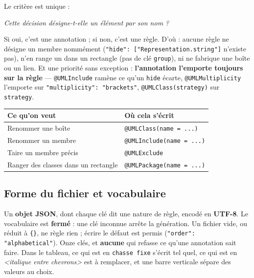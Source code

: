 \documentclass[12pt, a4paper]{article}
\newcommand{\meta}[1]{\textnormal{\textit{<#1>}}}
\begin{document}
Le critère est unique :

\begin{center}
\textit{Cette décision désigne-t-elle un élément par son nom ?}
\end{center}

Si oui, c'est une annotation ; si non, c'est une règle. D'où : aucune règle ne désigne un membre nommément (\texttt{"hide": ["Representation.string"]} n'existe pas), n'en range un dans un rectangle (pas de clé \texttt{group}), ni ne fabrique une boîte ou un lien. Et une priorité sans exception : \textbf{l'annotation l'emporte toujours sur la règle} --- \texttt{@UMLInclude} ramène ce qu'un \texttt{hide} écarte, \texttt{@UMLMultiplicity} l'emporte sur \texttt{"multiplicity": "brackets"}, \texttt{@UMLClass(strategy)} sur \texttt{strategy}.

\begin{center}
\begin{tabular}{@{}L{7.3cm}L{9.3cm}@{}}
\hline
\textbf{Ce qu'on veut} & \textbf{Où cela s'écrit} \\
\hline
Renommer une boîte & \texttt{@UMLClass(name = ...)} \\
Renommer un membre & \texttt{@UMLInclude(name = ...)} \\
Taire un membre précis & \texttt{@UMLExclude} \\
Ranger des classes dans un rectangle & \texttt{@UMLPackage(name = ...)} \\
\hline
\end{tabular}
\end{center}

\subsection{Forme du fichier et vocabulaire}
\label{sec:vocabulaire}
Un \textbf{objet JSON}, dont chaque clé dit une nature de règle, encodé en \textbf{UTF-8}. Le vocabulaire est \textbf{fermé} : une clé inconnue arrête la génération. Un fichier vide, ou réduit à \texttt{\{\}}, ne règle rien ; écrire le défaut est permis (\texttt{"order": "alphabetical"}). Onze clés, et \textbf{aucune} qui refasse ce qu'une annotation sait faire. Dans le tableau, ce qui est en \texttt{chasse fixe} s'écrit tel quel, ce qui est en \meta{italique entre chevrons} est à remplacer, et une barre verticale sépare des valeurs au choix.
\end{document}

